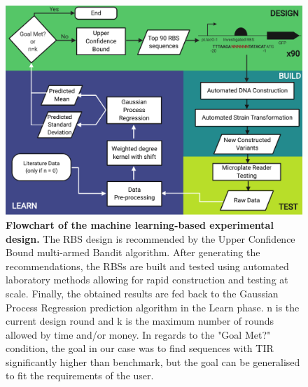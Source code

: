 \documentclass{article}
\begin{document}
\begin{figure}[h]
    \centering
    \includegraphics[scale=0.7]{plots/Main_Paper/flowchart.pdf}
    \caption{\textbf{Flowchart of the machine learning-based experimental design.} The RBS design is recommended by the Upper Confidence Bound multi-armed Bandit algorithm. After generating the recommendations, the RBSs are built and tested using automated laboratory methods allowing for rapid construction and testing at scale. Finally, the obtained results are fed back to the Gaussian Process Regression prediction algorithm in the Learn phase. n is the current design round and k is the maximum number of rounds allowed by time and/or money. In regards to the "Goal Met?" condition, the goal in our case was to find sequences with TIR significantly higher than benchmark, but the goal can be generalised to fit the requirements of the user.}
    \label{fig: Flowchart}
\end{figure}
\end{document}
